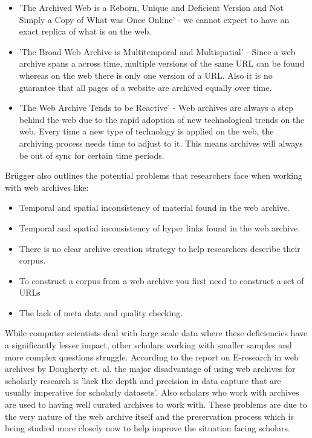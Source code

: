 \begin{itemize}
	\item 'The Archived Web is a Reborn, Unique and Deficient Version and Not Simply a Copy of What was Once Online' - we cannot expect to have an exact replica of what is on the web.
	\item 'The Broad Web Archive is Multitemporal and Multispatial' - Since a web archive spans a across time, multiple versions of the same URL can be found whereas on the web there is only one version of a URL. Also it is no guarantee that all pages of a website are archived equally over time.
	\item 'The Web Archive Tends to be Reactive' - Web archives are always a step behind the web due to the rapid adoption of new technological trends on the web. Every time a new type of technology is applied on the web, the archiving process needs time to adjust to it. This means archives will always be out of sync for certain time periods.
\end{itemize}

Br\"ugger also outlines the potential problems that researchers face when working with web archives like:

\begin{itemize}
	\item Temporal and spatial inconsistency of material found in the web archive.
	\item Temporal and spatial inconsistency of hyper links found in the web archive.
	\item There is no clear archive creation strategy to help researchers describe their corpus.
	\item To construct a corpus from a web archive you first need to construct a set of URLs
	\item The lack of meta data and quality checking.
\end{itemize}

While computer scientists deal with large scale data where these deficiencies have a significantly lesser impact, other scholars working with smaller samples and more complex questions struggle. According to the report on E-research in web archives by Dougherty et. al. \cite{dougherty2010researcher} the major disadvantage of using web archives for scholarly research is 'lack the depth and precision in data capture that are usually imperative for scholarly datasets'. Also scholars who work with archives are used to having well curated archives to work with. These problems are due to the very nature of the web archive itself and the preservation process which is being studied more closely now to help improve the situation facing scholars.

